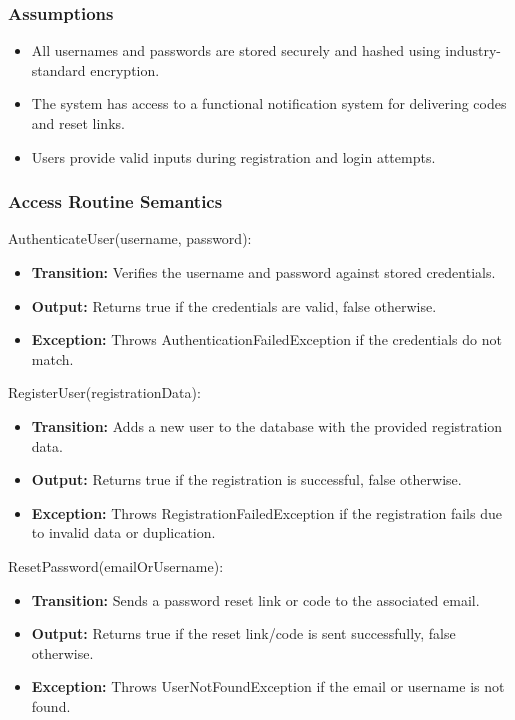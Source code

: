 \documentclass[12pt, titlepage]{article}
\begin{document}
\subsubsection{Assumptions}

\begin{itemize}
  \item All usernames and passwords are stored securely and hashed using industry-standard encryption.
  \item The system has access to a functional notification system for delivering codes and reset links.
  \item Users provide valid inputs during registration and login attempts.
\end{itemize}

\subsubsection{Access Routine Semantics}

\noindent AuthenticateUser(username, password):
\begin{itemize}
  \item \textbf{Transition:} Verifies the username and password against stored credentials.
  \item \textbf{Output:} Returns true if the credentials are valid, false otherwise.
  \item \textbf{Exception:} Throws AuthenticationFailedException if the credentials do not match.
\end{itemize}

\noindent RegisterUser(registrationData):
\begin{itemize}
  \item \textbf{Transition:} Adds a new user to the database with the provided registration data.
  \item \textbf{Output:} Returns true if the registration is successful, false otherwise.
  \item \textbf{Exception:} Throws RegistrationFailedException if the registration fails due to invalid data or duplication.
\end{itemize}

\noindent ResetPassword(emailOrUsername):
\begin{itemize}
  \item \textbf{Transition:} Sends a password reset link or code to the associated email.
  \item \textbf{Output:} Returns true if the reset link/code is sent successfully, false otherwise.
  \item \textbf{Exception:} Throws UserNotFoundException if the email or username is not found.
\end{itemize}
\end{document}
